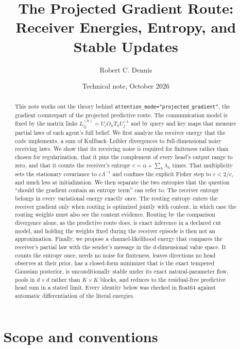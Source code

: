 \documentclass[11pt]{article}
\title{The Projected Gradient Route:\\ Receiver Energies, Entropy, and Stable Updates}
\author{Robert C. Dennis}
\date{Technical note, October 2026}
\theoremstyle{definition}
\theoremstyle{remark}
\newcommand{\cfg}[1]{\texttt{#1}}
\begin{document}
\maketitle

\begin{abstract}
This note works out the theory behind \cfg{attention\_mode="projected\_gradient"}, the gradient counterpart of the projected predictive route. The communication model is fixed by the matrix links $L_{ij}^{(h)}=U_iO_hT_hU_j^{-1}$ and by query and key maps that measure partial laws of each agent's full belief. We first analyze the receiver energy that the code implements, a sum of Kullback--Leibler divergences to full-dimensional noisy receiving laws. We show that its receiving noise is required for finiteness rather than chosen for regularization, that it pins the complement of every head's output range to zero, and that it counts the receiver's entropy $c=\alpha+\sum_h\lambda_h$ times. That multiplicity sets the stationary covariance to $c\Lambda^{-1}$ and confines the explicit Fisher step to $\varepsilon<2/c$, and much less at initialization. We then separate the two entropies that the question ``should the gradient contain an entropy term'' can refer to. The receiver entropy belongs in every variational energy exactly once. The routing entropy enters the receiver gradient only when routing is optimized jointly with content, in which case the routing weights must also see the content evidence. Routing by the comparison divergence alone, as the predictive route does, is exact inference in a declared cut model, and holding the weights fixed during the receiver episode is then not an approximation. Finally, we propose a channel-likelihood energy that compares the receiver's partial law with the sender's message in the $d$-dimensional value space. It counts the entropy once, needs no noise for finiteness, leaves directions no head observes at their prior, has a closed-form minimizer that is the exact tempered Gaussian posterior, is unconditionally stable under its exact natural-parameter flow, pools in $d\times d$ rather than $K\times K$ blocks, and reduces to the residual-free predictive head sum in a stated limit. Every identity below was checked in float64 against automatic differentiation of the literal energies.
\end{abstract}

\section{Scope and conventions}
\label{sec:scope}
\end{document}
